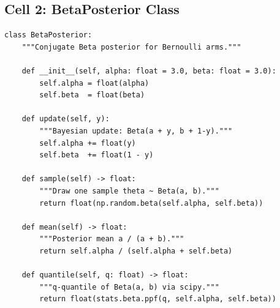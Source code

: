 \documentclass[11pt, letterpaper]{article}
\begin{document}
\subsection*{Cell 2: BetaPosterior Class}
\begin{lstlisting}
class BetaPosterior:
    """Conjugate Beta posterior for Bernoulli arms."""

    def __init__(self, alpha: float = 3.0, beta: float = 3.0):
        self.alpha = float(alpha)
        self.beta  = float(beta)

    def update(self, y):
        """Bayesian update: Beta(a + y, b + 1-y)."""
        self.alpha += float(y)
        self.beta  += float(1 - y)

    def sample(self) -> float:
        """Draw one sample theta ~ Beta(a, b)."""
        return float(np.random.beta(self.alpha, self.beta))

    def mean(self) -> float:
        """Posterior mean a / (a + b)."""
        return self.alpha / (self.alpha + self.beta)

    def quantile(self, q: float) -> float:
        """q-quantile of Beta(a, b) via scipy."""
        return float(stats.beta.ppf(q, self.alpha, self.beta))
\end{lstlisting}
\end{document}
